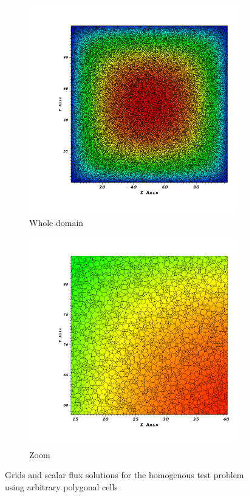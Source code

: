 \begin{figure}[!htbp]
  \centering
  \begin{subfigure}{0.45\textwidth}
    \centering
    \includegraphics[width=\textwidth]{polygon_solu0000}
    \caption{Whole domain}
  \end{subfigure}
  \begin{subfigure}{0.45\textwidth}
    \centering
    \includegraphics[width=\textwidth]{polygon_solu0001}
    \caption{Zoom}
  \end{subfigure}
  \caption{Grids and scalar flux solutions for the homogenous test problem  using arbitrary polygonal cells}
  \label{homog_test_polys}
\end{figure}

